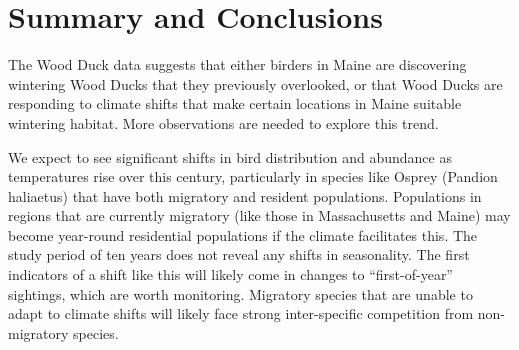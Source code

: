 \documentclass[
  12pt,
]{article}
\begin{document}
\newpage

\hypertarget{summary-and-conclusions}{%
\section{Summary and Conclusions}\label{summary-and-conclusions}}

The Wood Duck data suggests that either birders in Maine are discovering
wintering Wood Ducks that they previously overlooked, or that Wood Ducks
are responding to climate shifts that make certain locations in Maine
suitable wintering habitat. More observations are needed to explore this
trend.

We expect to see significant shifts in bird distribution and abundance
as temperatures rise over this century, particularly in species like
Osprey (Pandion haliaetus) that have both migratory and resident
populations. Populations in regions that are currently migratory (like
those in Massachusetts and Maine) may become year-round residential
populations if the climate facilitates this. The study period of ten
years does not reveal any shifts in seasonality. The first indicators of
a shift like this will likely come in changes to ``first-of-year''
sightings, which are worth monitoring. Migratory species that are unable
to adapt to climate shifts will likely face strong inter-specific
competition from non-migratory species.
\end{document}
